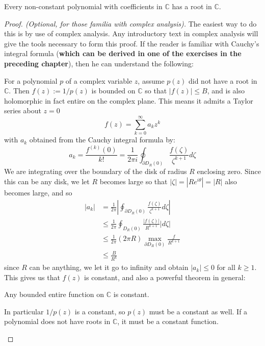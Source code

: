 \begin{appendices}
	 \begin{theorem}
	 	Every non-constant polynomial with coefficients in $\mathbb{C}$ has a root in $\mathbb C$.
	 \end{theorem}
	 \begin{proof}[Proof. (Optional, for those familia with complex analysis)]
	 The easiest way to do this is by use of complex analysis. Any introductory text in complex analysis will give the tools necessary to form this proof. If the reader is familiar with Cauchy's integral formula (\textbf{which can be derived in one of the exercises in the preceding chapter}), then he can understand the following:\\
		
		\begin{small}
		
		For a polynomial $p$ of a complex variable $z$, assume $p(z)$ did not have a root in $\mathbb{C}$. Then $f(z):= 1/p(z)$ is bounded on $\mathbb{C}$ so that $|f(z)|\leq B$, and is also holomorphic in fact entire on the complex plane. This means it admits a Taylor series about $z=0$
		\begin{equation}
			f(z) = \sum_{k=0}^\infty a_k z^k
		\end{equation}
		with $a_k$ obtained from the Cauchy integral formula by:
		\begin{equation}
			a_k = \frac{f^{(k)}(0)}{k!} = \frac{1}{2\pi i} \oint_{\partial D_R(0)} \frac{f(\zeta)}{\zeta^{k+1}} d\zeta
		\end{equation}
		We are integrating over the boundary of the disk of radius $R$ enclosing zero. Since this can be any disk, we let $R$ becomes large so that $|\zeta| = |R e^{i\theta}| = |R|$ also becomes large, and so 
		\begin{align*}
			|a_k| &= \frac{1}{2\pi} \left|\oint_{\partial D_R (0)} \frac{f(\zeta)}{\zeta^{k+1}} d\zeta \right| \\
			&\leq \frac{1}{2\pi} \oint_{D_R(0)} \frac{|f(\zeta)|}{R^{k+1}} |d\zeta|\\
			&\leq \frac{1}{2\pi} (2 \pi R) \max_{\partial D_R (0)} \frac{f}{R^{k+1}}\\
			&\leq \frac{B}{R^k}
		\end{align*}
		since $R$ can be anything, we let it go to infinity and obtain $|a_k| \leq 0$ for all $k \geq 1$. This gives us that $f(z)$ is constant, and also a powerful theorem in general:
		\begin{theorem}[Liouville]
			Any bounded entire function on $\mathbb C$ is constant.
		\end{theorem}
		In particular $1/p(z)$ is a constant, so $p(z)$ must be a constant as well. If a polynomial does not have roots in $\mathbb{C}$, it must be a constant function.
		\end{small}
	 \end{proof}
	 

\end{appendices}
